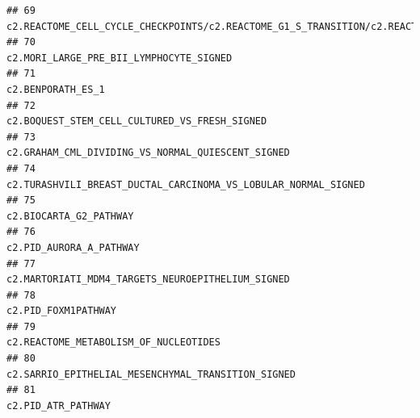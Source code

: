 \documentclass{article}\usepackage[]{graphicx}\usepackage[]{color}
\makeatletter
\newenvironment{kframe}{%
 \def\at@end@of@kframe{}%
 \ifinner\ifhmode%
  \def\at@end@of@kframe{\end{minipage}}%
  \begin{minipage}{\columnwidth}%
 \fi\fi%
 \def\FrameCommand##1{\hskip\@totalleftmargin \hskip-\fboxsep
 \colorbox{shadecolor}{##1}\hskip-\fboxsep
     \hskip-\linewidth \hskip-\@totalleftmargin \hskip\columnwidth}%
 \MakeFramed {\advance\hsize-\width
   \@totalleftmargin\z@ \linewidth\hsize
   \@setminipage}}%
 {\par\unskip\endMakeFramed%
 \at@end@of@kframe}
\newenvironment{knitrout}{}{} %
\makeatother
\begin{document}
\begin{knitrout}
\begin{kframe}
\begin{verbatim}
## 69  c2.REACTOME_CELL_CYCLE_CHECKPOINTS/c2.REACTOME_G1_S_TRANSITION/c2.REACTOME_SYNTHESIS_OF_DNA/c2.REACTOME_MITOTIC_G1_G1_S_PHASES/c2.REACTOME_MITOTIC_M_M_G1_PHASES/c2.REACTOME_DNA_REPLICATION/c2.REACTOME_S_PHASE
## 70                                                                                                                                                                           c2.MORI_LARGE_PRE_BII_LYMPHOCYTE_SIGNED
## 71                                                                                                                                                                                                 c2.BENPORATH_ES_1
## 72                                                                                                                                                                     c2.BOQUEST_STEM_CELL_CULTURED_VS_FRESH_SIGNED
## 73                                                                                                                                                                 c2.GRAHAM_CML_DIVIDING_VS_NORMAL_QUIESCENT_SIGNED
## 74                                                                                                                                                    c2.TURASHVILI_BREAST_DUCTAL_CARCINOMA_VS_LOBULAR_NORMAL_SIGNED
## 75                                                                                                                                                                                            c2.BIOCARTA_G2_PATHWAY
## 76                                                                                                                                                                                           c2.PID_AURORA_A_PATHWAY
## 77                                                                                                                                                                 c2.MARTORIATI_MDM4_TARGETS_NEUROEPITHELIUM_SIGNED
## 78                                                                                                                                                                                               c2.PID_FOXM1PATHWAY
## 79                                                                                                                                                                             c2.REACTOME_METABOLISM_OF_NUCLEOTIDES
## 80                                                                                                                                                                c2.SARRIO_EPITHELIAL_MESENCHYMAL_TRANSITION_SIGNED
## 81                                                                                                                                                                                                c2.PID_ATR_PATHWAY

\end{verbatim}
\end{kframe}
\end{knitrout}
\end{document}
